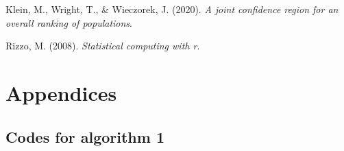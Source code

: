 \documentclass[
  12pt,
  a4paper,
]{article}
\newlength{\cslhangindent}
\newenvironment{CSLReferences}[2] %
 {\begin{list}{}{%
  \setlength{\itemindent}{0pt}
  \setlength{\leftmargin}{0pt}
  \setlength{\parsep}{0pt}
  \ifodd #1
   \setlength{\leftmargin}{\cslhangindent}
   \setlength{\itemindent}{-1\cslhangindent}
  \fi
  \setlength{\itemsep}{#2\baselineskip}}}
 {\end{list}}
\numberwithin{equation}{section}
\begin{document}
\label{refs}
\begin{CSLReferences}{1}{0}
Klein, M., Wright, T., \& Wieczorek, J. (2020). \emph{A joint confidence region for an overall ranking of populations}.

Rizzo, M. (2008). \emph{Statistical computing with r}.

\end{CSLReferences}

\section*{Appendices}\label{appendices}

\subsection*{Codes for algorithm 1}\label{codes-for-algorithm-1}
\end{document}
